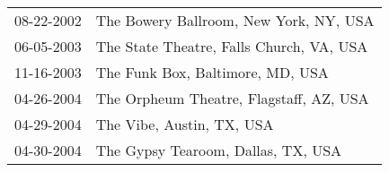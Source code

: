 \begin{supertabular}{ll}
 08-22-2002 &    The Bowery Ballroom, New York, NY, USA \\
 06-05-2003 &  The State Theatre, Falls Church, VA, USA \\
 11-16-2003 &          The Funk Box, Baltimore, MD, USA \\
 04-26-2004 &   The Orpheum Theatre, Flagstaff, AZ, USA \\
 04-29-2004 &                 The Vibe, Austin, TX, USA \\
 04-30-2004 &        The Gypsy Tearoom, Dallas, TX, USA \\
\end{supertabular}
